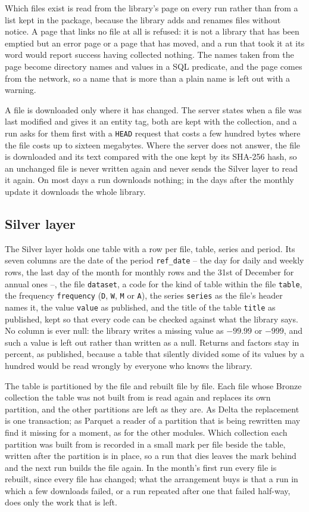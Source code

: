Which files exist is read from the library's page on every run rather than from a list kept in the package, because the library adds and renames files without notice. A page that links no file at all is refused: it is not a library that has been emptied but an error page or a page that has moved, and a run that took it at its word would report success having collected nothing. The names taken from the page become directory names and values in a SQL predicate, and the page comes from the network, so a name that is more than a plain name is left out with a warning.

A file is downloaded only where it has changed. The server states when a file was last modified and gives it an entity tag, both are kept with the collection, and a run asks for them first with a \verb|HEAD| request that costs a few hundred bytes where the file costs up to sixteen megabytes. Where the server does not answer, the file is downloaded and its text compared with the one kept by its SHA-256 hash, so an unchanged file is never written again and never sends the Silver layer to read it again. On most days a run downloads nothing; in the days after the monthly update it downloads the whole library.

\subsection{Silver layer}

The Silver layer holds one table with a row per file, table, series and period. Its seven columns are the date of the period \verb|ref_date| -- the day for daily and weekly rows, the last day of the month for monthly rows and the 31st of December for annual ones --, the file \verb|dataset|, a code for the kind of table within the file \verb|table|, the frequency \verb|frequency| (\verb|D|, \verb|W|, \verb|M| or \verb|A|), the series \verb|series| as the file's header names it, the value \verb|value| as published, and the title of the table \verb|title| as published, kept so that every code can be checked against what the library says. No column is ever null: the library writes a missing value as $-99.99$ or $-999$, and such a value is left out rather than written as a null. Returns and factors stay in percent, as published, because a table that silently divided some of its values by a hundred would be read wrongly by everyone who knows the library.

The table is partitioned by the file and rebuilt file by file. Each file whose Bronze collection the table was not built from is read again and replaces its own partition, and the other partitions are left as they are. As Delta the replacement is one transaction; as Parquet a reader of a partition that is being rewritten may find it missing for a moment, as for the other modules. Which collection each partition was built from is recorded in a small mark per file beside the table, written after the partition is in place, so a run that dies leaves the mark behind and the next run builds the file again. In the month's first run every file is rebuilt, since every file has changed; what the arrangement buys is that a run in which a few downloads failed, or a run repeated after one that failed half-way, does only the work that is left.

